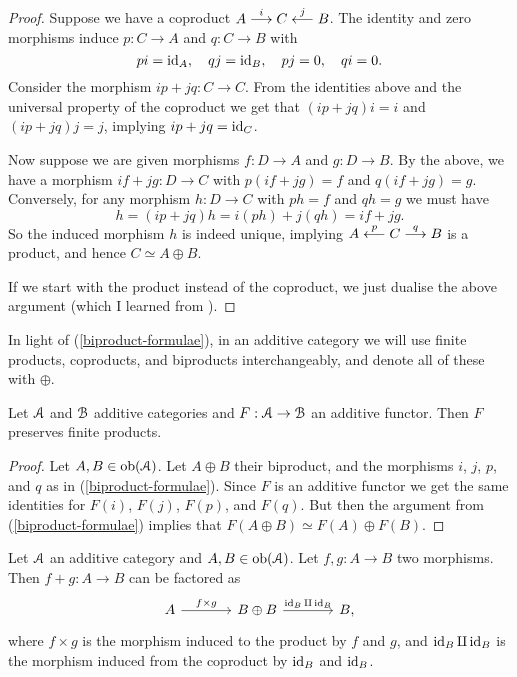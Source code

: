 \begin{proof}
  Suppose we have a coproduct $A \overset{i}{\longrightarrow} C
  \overset{j}{\longleftarrow} B$. The identity and zero morphisms induce $p
  : C \to A$ and $q : C \to B$ with
  \[
  pi = \operatorname{id}_A, \quad qj = \operatorname{id}_B, \quad pj = 0, \quad qi = 0.
  \]
  Consider the morphism $ip + jq : C \to C$. From the identities above
  and the universal property of the coproduct we get that $(ip + jq)i
  = i$ and $(ip+jq)j = j$, implying $ip+jq = \operatorname{id}_C$.

  \medskip
  Now suppose we are given morphisms $f : D \to A$ and $g : D \to
  B$. By the above, we have a morphism $if + jg : D \to C$ with
  $p(if+jg) = f$ and $q(if+jg) = g$. Conversely, for any morphism $h :
  D \to C$ with $ph = f$ and $qh = g$ we must have
  \[
  h = (ip+jq)h = i(ph) + j(qh) = if + jg.
  \]
  So the induced morphism $h$ is indeed unique, implying $A
  \overset{p}{\longleftarrow} C \overset{q}{\longrightarrow} B$ is a product, and
  hence $C \simeq A \oplus B$.

  \medskip
  If we start with the product instead of the coproduct, we just
  dualise the above argument (which I learned from
  \cite{mo-additive-functor-direct-sum}).
\end{proof}


\begin{notation}
  In light of (\ref{biproduct-formulae}), in an additive category we
  will use finite products, coproducts, and biproducts
  interchangeably, and denote all of these with $\oplus$.
\end{notation}

\begin{lemma}
  \label{additive-functor-preserves-products}
  Let $\mathcal{A}$ and $\mathcal{B}$ additive categories and $F : \mathcal{A} \to \mathcal{B}$ an
  additive functor. Then $F$ preserves finite products.
\end{lemma}

\begin{proof}
  Let $A,B \in \operatorname{ob}(\mathcal{A})$. Let $A \oplus B$ their biproduct, and the
  morphisms $i$, $j$, $p$, and $q$ as in
  (\ref{biproduct-formulae}). Since $F$ is an additive functor we get
  the same identities for $F(i)$, $F(j)$, $F(p)$, and $F(q)$.  But
  then the argument from (\ref{biproduct-formulae}) implies that $F(A
  \oplus B) \simeq F(A) \oplus F(B)$.
\end{proof}

\begin{lemma}
  \label{sum-factor}
  Let $\mathcal{A}$ an additive category and $A,B \in \operatorname{ob}(\mathcal{A})$. Let $f,g : A
  \to B$ two morphisms. Then $f + g : A \to B$ can be factored as
  \[
  \begin{tikzcd}[column sep = large]
    A \rar{f \times g} & B \oplus B \rar{\id_B \amalg \id_B} & B,
  \end{tikzcd}
  \]
  where $f \times g$ is the morphism induced to the product by $f$ and
  $g$, and $\operatorname{id}_B \amalg \operatorname{id}_B$ is the morphism induced from the
  coproduct by $\operatorname{id}_B$ and $\operatorname{id}_B$.
\end{lemma}

